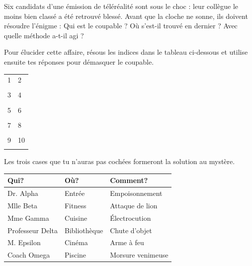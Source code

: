 


Six candidats d'une émission de téléréalité sont sous le choc : leur collègue le moins bien classé a été retrouvé blessé. Avant que la cloche ne sonne, ils doivent résoudre l'énigme :
Qui est le coupable ? Où s'est-il trouvé en dernier ? Avec quelle méthode a-t-il agi ?

Pour élucider cette affaire, résous les indices dans le tableau ci-dessous et utilise ensuite tes réponses pour démasquer le coupable.

\vfill
\begin{tabularx}{\linewidth}{|X|X|}
\hline
	1&2\\
	&\\[80pt]
\hline
	3&4\\
	&\\[80pt]
\hline
	5&6\\
	&\\[80pt]
\hline
	7&8\\
	&\\[80pt]
\hline
	9&10\\
	&\\[80pt]
\hline
\end{tabularx}

\newpage
Les trois cases que tu n'auras pas cochées formeront la solution au mystère.

\vspace{20pt}
\def\arraystretch{1.5}
\begin{tabularx}{\linewidth}{|X|X|X|}
\hline
	\textbf{Qui?}&\textbf{Où?}&\textbf{Comment?}\\
\hline
	Dr. Alpha \hfill\Box&Entrée \hfill\Box&Empoisonnement \hfill\Box\\
\hline
	Mlle Beta \hfill\Box&Fitness \hfill\Box&Attaque de lion \hfill\Box\\
\hline
	Mme Gamma \hfill\Box&Cuisine \hfill\Box&Électrocution \hfill\Box\\
\hline
	Professeur Delta \hfill\Box&Bibliothèque \hfill\Box&Chute d'objet \hfill\Box\\
\hline
	M. Epsilon \hfill\Box&Cinéma \hfill\Box&Arme à feu \hfill\Box\\
\hline
	Coach Omega \hfill\Box&Piscine \hfill\Box&Morsure venimeuse \hfill\Box\\
\hline
\end{tabularx}
\def\arraystretch{1}

